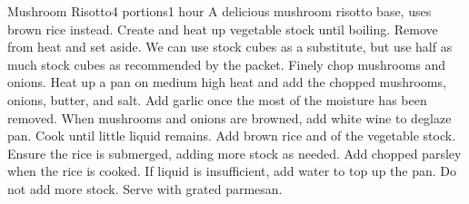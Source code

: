 \documentclass[11pt]{article}
\begin{document}
\begin{recipe}[MushroomRisotto]{Mushroom Risotto}{4 portions}{1 hour}
    \freeform A delicious mushroom risotto base, uses brown rice instead.
    Create and heat up vegetable stock until boiling. Remove from heat and set aside. We can use stock cubes as a substitute, but use half as much stock cubes as recommended by the packet.
    Finely chop mushrooms and onions. Heat up a pan on medium high heat and add the chopped mushrooms, onions, butter, and salt.
    Add garlic once the most of the moisture has been removed. When mushrooms and onions are browned, add white wine to deglaze pan. Cook until little liquid remains. 
    Add brown rice and  of the vegetable stock. Ensure the rice is submerged, adding more stock as needed.
    Add chopped parsley when the rice is cooked. If liquid is insufficient, add water to top up the pan. Do not add more stock.
    Serve with grated parmesan.
    \freeform\hrulefill
\end{recipe}
\end{document}
